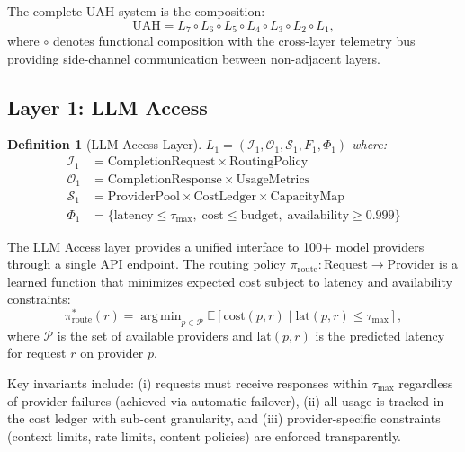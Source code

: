 \documentclass[11pt]{article}
\newtheorem{definition}{Definition}
\DeclareMathOperator*{\argmin}{arg\,min}
\begin{document}
The complete UAH system is the composition:
\begin{equation}
    \text{UAH} = L_7 \circ L_6 \circ L_5 \circ L_4 \circ L_3 \circ L_2 \circ L_1,
\end{equation}
where $\circ$ denotes functional composition with the cross-layer telemetry
bus providing side-channel communication between non-adjacent layers.

\subsection{Layer 1: LLM Access}

\begin{definition}[LLM Access Layer]
    $L_1 = \left(\mathcal{I}_1, \mathcal{O}_1, \mathcal{S}_1, F_1, \Phi_1\right)$ where:
    \begin{align*}
        \mathcal{I}_1 &= \text{CompletionRequest} \times \text{RoutingPolicy} \\
        \mathcal{O}_1 &= \text{CompletionResponse} \times \text{UsageMetrics} \\
        \mathcal{S}_1 &= \text{ProviderPool} \times \text{CostLedger} \times \text{CapacityMap} \\
        \Phi_1 &= \{\text{latency} \leq \tau_{\max},\; \text{cost} \leq \text{budget},\;
                    \text{availability} \geq 0.999\}
    \end{align*}
\end{definition}

The LLM Access layer provides a unified interface to 100+ model providers
through a single API endpoint. The routing policy $\pi_{\text{route}} :
\text{Request} \to \text{Provider}$ is a learned function that minimizes
expected cost subject to latency and availability constraints:
\begin{equation}
    \pi_{\text{route}}^*(r) = \argmin_{p \in \mathcal{P}}
        \mathbb{E}\left[\text{cost}(p, r) \mid \text{lat}(p, r) \leq \tau_{\max}\right],
\end{equation}
where $\mathcal{P}$ is the set of available providers and $\text{lat}(p, r)$
is the predicted latency for request $r$ on provider $p$.

Key invariants include: (i) requests must receive responses within
$\tau_{\max}$ regardless of provider failures (achieved via automatic failover),
(ii) all usage is tracked in the cost ledger with sub-cent granularity, and
(iii) provider-specific constraints (context limits, rate limits, content
policies) are enforced transparently.
\end{document}
